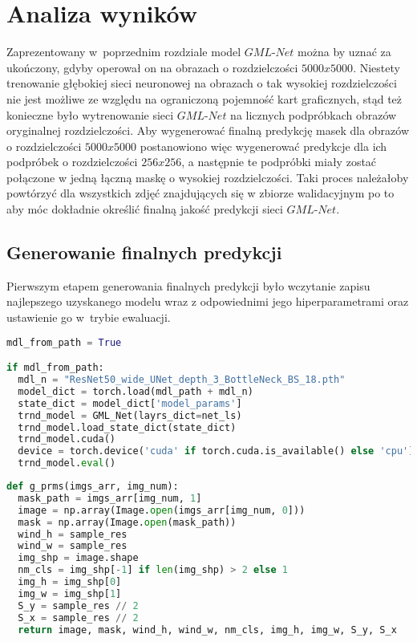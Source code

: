\section{Analiza wyników}

\cell
Zaprezentowany w~poprzednim rozdziale model $\textit{GML-Net}$ można by uznać za ukończony, gdyby operował on na obrazach o rozdzielczości $\textit{5000x5000}$. Niestety trenowanie głębokiej sieci neuronowej na obrazach o tak wysokiej rozdzielczości nie jest możliwe ze względu na ograniczoną pojemność kart graficznych, stąd też konieczne było wytrenowanie sieci $\textit{GML-Net}$ na licznych podpróbkach obrazów oryginalnej rozdzielczości. Aby wygenerować finalną predykcję masek dla obrazów o rozdzielczości $\textit{5000x5000}$ postanowiono więc wygenerować predykcje dla ich podpróbek o rozdzielczości $\textit{256x256}$, a następnie te podpróbki miały zostać połączone w jedną łączną maskę o wysokiej rozdzielczości. Taki proces należałoby powtórzyć dla wszystkich zdjęć znajdujących się w zbiorze walidacyjnym po to aby móc dokładnie określić finalną jakość predykcji sieci $\textit{GML-Net}$.

\subsection{Generowanie finalnych predykcji}
Pierwszym etapem generowania finalnych predykcji było wczytanie zapisu najlepszego uzyskanego modelu wraz z odpowiednimi jego hiperparametrami oraz ustawienie go w~trybie ewaluacji.

\cell
\begin{lstlisting}[name=Rozdzial3.1, language=Python]
mdl_from_path = True

if mdl_from_path:
  mdl_n = "ResNet50_wide_UNet_depth_3_BottleNeck_BS_18.pth"
  model_dict = torch.load(mdl_path + mdl_n)
  state_dict = model_dict['model_params']
  trnd_model = GML_Net(layrs_dict=net_ls)
  trnd_model.load_state_dict(state_dict)
  trnd_model.cuda()
  device = torch.device('cuda' if torch.cuda.is_available() else 'cpu')
  trnd_model.eval()
\end{lstlisting}

\cell
\begin{lstlisting}[name=Rozdzial3.1, language=Python]
def g_prms(imgs_arr, img_num):
  mask_path = imgs_arr[img_num, 1]
  image = np.array(Image.open(imgs_arr[img_num, 0]))
  mask = np.array(Image.open(mask_path))
  wind_h = sample_res
  wind_w = sample_res
  img_shp = image.shape
  nm_cls = img_shp[-1] if len(img_shp) > 2 else 1
  img_h = img_shp[0]
  img_w = img_shp[1]
  S_y = sample_res // 2
  S_x = sample_res // 2
  return image, mask, wind_h, wind_w, nm_cls, img_h, img_w, S_y, S_x
\end{lstlisting}


